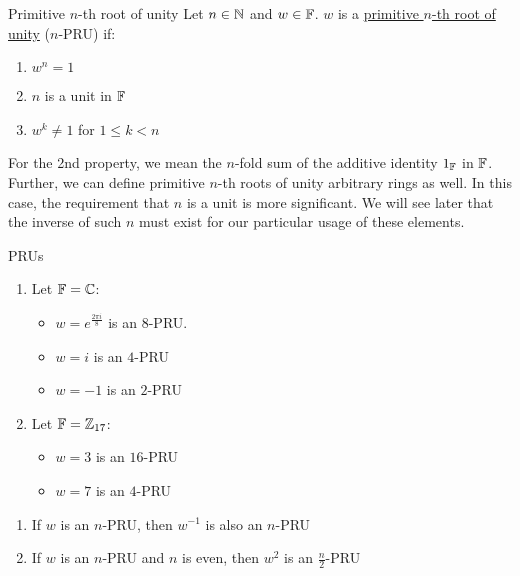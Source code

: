 \begin{definition}{Primitive $n$-th root of unity}{}
    Let $n \in \operatorname{\mathbb{N}}$ and $w \in \operatorname{\mathbb{F}}$. $w$ is a \ul{primitive $n$-th root of unity} ($n$-PRU) if:
    \begin{enumerate}
        \item $w^n = 1$
        \item $n$ is a unit in $\operatorname{\mathbb{F}}$
        \item $w^k \neq 1$ for $1 \leq k < n$
    \end{enumerate}
\end{definition}
\begin{remark}
    For the 2nd property, we mean the $n$-fold sum of the additive identity $1_{\operatorname{\mathbb{F}}}$ in $\operatorname{\mathbb{F}}$.
    Further, we can define primitive $n$-th roots of unity arbitrary rings as well.
    In this case, the requirement that $n$ is a unit is more significant.
    We will see later that the inverse of such $n$ must exist for our particular usage of these elements.
\end{remark}

\begin{example}{PRUs}{}
    \begin{enumerate}
        \item Let $\operatorname{\mathbb{F}} = \operatorname{\mathbb{C}}$:
        \begin{itemize}
            \item $w = e^{\frac{2\pi i}{8}}$ is an $8$-PRU.
            \item $w = i$ is an $4$-PRU
            \item $w = -1$ is an $2$-PRU
        \end{itemize}

        \item Let $\operatorname{\mathbb{F}} = \operatorname{\mathbb{Z}}_{17}$:
        \begin{itemize}
            \item $w = 3$ is an $16$-PRU
            \item $w = 7$ is an $4$-PRU
        \end{itemize}
    \end{enumerate}
\end{example}

\begin{proposition}{}{}
    \begin{enumerate}
        \item If $w$ is an $n$-PRU, then $w^{-1}$ is also an $n$-PRU
        \item If $w$ is an $n$-PRU and $n$ is even, then $w^2$ is an $\frac{n}{2}$-PRU
    \end{enumerate}
\end{proposition}

